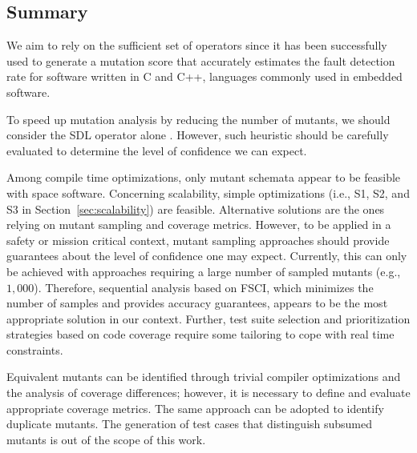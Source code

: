 

\subsection{Summary}
\label{sec:back:summary}

We aim to rely on the sufficient set of operators since it has been successfully used to generate a mutation score that accurately estimates the fault detection rate for software written in C and C++, languages commonly used in embedded software.

To speed up mutation analysis by reducing the number of mutants, we should consider the SDL operator alone . However, such heuristic should be carefully evaluated to determine the level of confidence we can expect.

Among compile time optimizations, only mutant schemata appear to be feasible with space software.
Concerning scalability, simple optimizations (i.e., S1, S2, and S3 in Section~\ref{sec:scalability}) are feasible. Alternative solutions are the ones relying on mutant sampling and coverage metrics.
However, to be applied in a safety or mission critical context, mutant sampling approaches should provide guarantees about the
level of confidence one may expect. Currently, this can only be achieved with approaches requiring a large number of sampled mutants (e.g., $1,000$).  Therefore, sequential analysis based on FSCI, which minimizes the number of samples and provides accuracy guarantees, appears to be the most appropriate solution in our context.
Further, test suite selection and prioritization strategies based on code coverage require some tailoring to cope with real time constraints.

Equivalent mutants can be identified through trivial compiler optimizations and the analysis of coverage differences; however, it is necessary to define and evaluate appropriate coverage metrics. The same approach can be adopted to identify duplicate mutants. The generation of test cases that distinguish subsumed mutants is out of the scope of this work.

